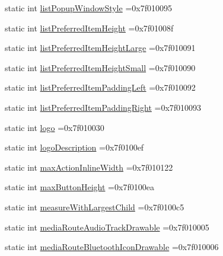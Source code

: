 \begin{DoxyCompactItemize}
static int \hyperlink{classandroid_1_1support_1_1v7_1_1appcompat_1_1R_1_1attr_a6c3e8088ac6dfdc51c06245cf9673ed4}{list\+Popup\+Window\+Style} =0x7f010095
\item 
static int \hyperlink{classandroid_1_1support_1_1v7_1_1appcompat_1_1R_1_1attr_a054ea1bd82a17a4a8f87815b99a973dd}{list\+Preferred\+Item\+Height} =0x7f01008f
\item 
static int \hyperlink{classandroid_1_1support_1_1v7_1_1appcompat_1_1R_1_1attr_acae731c234d2a8927d87b3ecd2fedc93}{list\+Preferred\+Item\+Height\+Large} =0x7f010091
\item 
static int \hyperlink{classandroid_1_1support_1_1v7_1_1appcompat_1_1R_1_1attr_a7c60f3752499ca7d45fa41451e0de852}{list\+Preferred\+Item\+Height\+Small} =0x7f010090
\item 
static int \hyperlink{classandroid_1_1support_1_1v7_1_1appcompat_1_1R_1_1attr_a5638fec2ab8bb6a2c4fa1e10cc96648a}{list\+Preferred\+Item\+Padding\+Left} =0x7f010092
\item 
static int \hyperlink{classandroid_1_1support_1_1v7_1_1appcompat_1_1R_1_1attr_a84cb41529bc5b6350af5f41bbea4e8cd}{list\+Preferred\+Item\+Padding\+Right} =0x7f010093
\item 
static int \hyperlink{classandroid_1_1support_1_1v7_1_1appcompat_1_1R_1_1attr_a112ee2368699d6914bca0aa5ac9bb096}{logo} =0x7f010030
\item 
static int \hyperlink{classandroid_1_1support_1_1v7_1_1appcompat_1_1R_1_1attr_aa0fd67233c5627d649c4a1f72cd41be8}{logo\+Description} =0x7f0100ef
\item 
static int \hyperlink{classandroid_1_1support_1_1v7_1_1appcompat_1_1R_1_1attr_a0204000e85bcf6c932950a48dfdf1553}{max\+Action\+Inline\+Width} =0x7f010122
\item 
static int \hyperlink{classandroid_1_1support_1_1v7_1_1appcompat_1_1R_1_1attr_a68c64276f777b020980f20b3a25352cf}{max\+Button\+Height} =0x7f0100ea
\item 
static int \hyperlink{classandroid_1_1support_1_1v7_1_1appcompat_1_1R_1_1attr_a57b891f80593796c5cba8f35567f332c}{measure\+With\+Largest\+Child} =0x7f0100c5
\item 
static int \hyperlink{classandroid_1_1support_1_1v7_1_1appcompat_1_1R_1_1attr_abceb9280c7bbae775d76137f6c23c8bf}{media\+Route\+Audio\+Track\+Drawable} =0x7f010005
\item 
static int \hyperlink{classandroid_1_1support_1_1v7_1_1appcompat_1_1R_1_1attr_af0d5cca1e5ef2227e17e2ceff427bc91}{media\+Route\+Bluetooth\+Icon\+Drawable} =0x7f010006
\item 

\end{DoxyCompactItemize}
